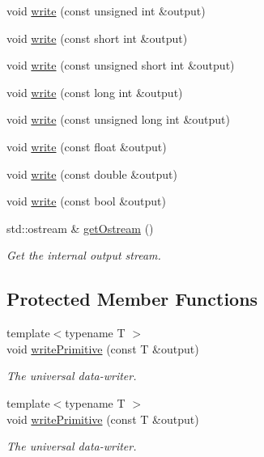 \begin{DoxyCompactItemize}
\item 
void \mbox{\hyperlink{classENSEM_1_1TextWriter_aeca2b6ad3ab9353c98220345c8f8edfe}{write}} (const unsigned int \&output)
\item 
void \mbox{\hyperlink{classENSEM_1_1TextWriter_af8e02d2f0ce493c50698a7999af9596c}{write}} (const short int \&output)
\item 
void \mbox{\hyperlink{classENSEM_1_1TextWriter_a7c3f545361114dcb952b07151188c18c}{write}} (const unsigned short int \&output)
\item 
void \mbox{\hyperlink{classENSEM_1_1TextWriter_a2bf45b3cde030d81948d6b13e5c76437}{write}} (const long int \&output)
\item 
void \mbox{\hyperlink{classENSEM_1_1TextWriter_ab619ef20f83f064bddb2ba4e5ab2b9dc}{write}} (const unsigned long int \&output)
\item 
void \mbox{\hyperlink{classENSEM_1_1TextWriter_a7209fb322f222a9d7354a0b03bc2c61c}{write}} (const float \&output)
\item 
void \mbox{\hyperlink{classENSEM_1_1TextWriter_af276971ecba157a3867e53ec909e543f}{write}} (const double \&output)
\item 
void \mbox{\hyperlink{classENSEM_1_1TextWriter_a3e99ec247c2bd70e5b4361bbb0264daf}{write}} (const bool \&output)
\item 
std\+::ostream \& \mbox{\hyperlink{classENSEM_1_1TextWriter_a40ade2e6c44ba267efdce5fb70909362}{get\+Ostream}} ()
\begin{DoxyCompactList}\small\item\em Get the internal output stream. \end{DoxyCompactList}\end{DoxyCompactItemize}
\subsection*{Protected Member Functions}
\begin{DoxyCompactItemize}
\item 
{\footnotesize template$<$typename T $>$ }\\void \mbox{\hyperlink{classENSEM_1_1TextWriter_aca159ff3db64ed918f7e4ddfed7a6d53}{write\+Primitive}} (const T \&output)
\begin{DoxyCompactList}\small\item\em The universal data-\/writer. \end{DoxyCompactList}\item 
{\footnotesize template$<$typename T $>$ }\\void \mbox{\hyperlink{classENSEM_1_1TextWriter_aca159ff3db64ed918f7e4ddfed7a6d53}{write\+Primitive}} (const T \&output)
\begin{DoxyCompactList}\small\item\em The universal data-\/writer. \end{DoxyCompactList}\end{DoxyCompactItemize}


